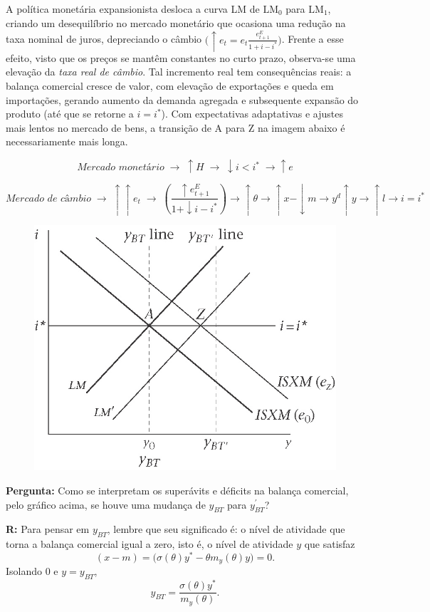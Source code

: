 \documentclass[a4paper,12pt]{article}[abntex2]
\begin{document}
A política monetária expansionista desloca a curva LM de $\mathrm{LM}_{0}$ para $\mathrm{LM}_{1}$, criando um
desequilíbrio no mercado monetário que ocasiona uma redução na taxa nominal de juros,
depreciando o câmbio $\bigl(\uparrow e_{t}=e_{t}\tfrac{e_{t+1}^{E}}{1+i-i^{\ast}}\bigr)$.
Frente a esse efeito, visto que os preços se mantêm constantes no curto prazo, observa-se
uma elevação da \emph{taxa real de câmbio}.  
Tal incremento real tem consequências reais: a balança comercial cresce de valor, com elevação de exportações
e queda em importações, gerando aumento da demanda agregada e subsequente expansão do produto
(até que se retorne a $i=i^{\ast}$).  
Com expectativas adaptativas e ajustes mais lentos no mercado de bens, a transição de A para Z
na imagem abaixo é necessariamente mais longa.

\[
\textit{Mercado monetário}\;\rightarrow\;\uparrow H\;\rightarrow\;\downarrow i<i^{\ast}\;\rightarrow\uparrow e
\]


\[
\textit{Mercado de câmbio}\;\rightarrow\;\uparrow\uparrow e_{t}\;
\rightarrow\;
\left(\frac{\uparrow e_{t+1}^{E}}{1+\downarrow i-i^{\ast}}\right)
\rightarrow
\uparrow\theta
\rightarrow
\uparrow x-\downarrow m
\rightarrow
y^{d}\uparrow y
\rightarrow
\uparrow l
\rightarrow
i=i^{\ast}
\]

\begin{figure}[H]
    \centering
    \includegraphics[width=0.7\linewidth]{Imagens/a23i2.png}
\end{figure}

\textbf{Pergunta:} Como se interpretam os superávits e déficits na balança comercial,
pelo gráfico acima, se houve uma mudança de $y_{BT}$ para $y_{BT}^{\prime}$?

\textbf{R:} Para pensar em $y_{BT}$, lembre que seu significado é: o nível de atividade que torna a balança
comercial igual a zero, isto é, o nível de atividade $y$ que satisfaz
\[
(x-m)=\bigl(\sigma(\theta)y^{\ast}-\theta m_{y}(\theta)y\bigr)=0.
\]
Isolando $0$ e $y=y_{BT}$,
\[
y_{BT}=\frac{\sigma(\theta)y^{\ast}}{m_{y}(\theta)}.
\]
\end{document}
